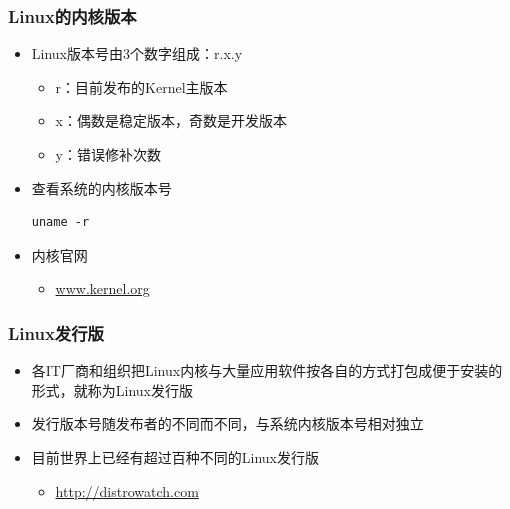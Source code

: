\documentclass[xcolor=svgnames,presentation]{beamer}
\begin{document}
\begin{frame}[fragile]
\frametitle{Linux的内核版本}
\label{sec-2-3-5}
\begin{itemize}

\item Linux版本号由3个数字组成：r.x.y
\label{sec-2-3-5-1}%
\begin{itemize}

\item r：目前发布的Kernel主版本
\label{sec-2-3-5-1-1}%

\item x：偶数是稳定版本，奇数是开发版本
\label{sec-2-3-5-1-2}%

\item y：错误修补次数
\label{sec-2-3-5-1-3}%
\end{itemize} %

\item 查看系统的内核版本号\\
\label{sec-2-3-5-2}%
\begin{verbatim}
uname -r
\end{verbatim}

\item 内核官网
\label{sec-2-3-5-3}%
\begin{itemize}

\item \href{https://www.kernel.org}{www.kernel.org}
\label{sec-2-3-5-3-1}%
\end{itemize} %
\end{itemize} %
\end{frame}
\begin{frame}
\frametitle{Linux发行版}
\label{sec-2-3-6}
\begin{itemize}

\item 各IT厂商和组织把Linux内核与大量应用软件按各自的方式打包成便于安装的形式，就称为Linux发行版
\label{sec-2-3-6-1}%

\item 发行版本号随发布者的不同而不同，与系统内核版本号相对独立
\label{sec-2-3-6-2}%

\item 目前世界上已经有超过百种不同的Linux发行版
\label{sec-2-3-6-3}%
\begin{itemize}

\item \href{http://distrowatch.com}{http://distrowatch.com}
\label{sec-2-3-6-3-1}%
\end{itemize} %
\end{itemize} %
\end{frame}
\end{document}
